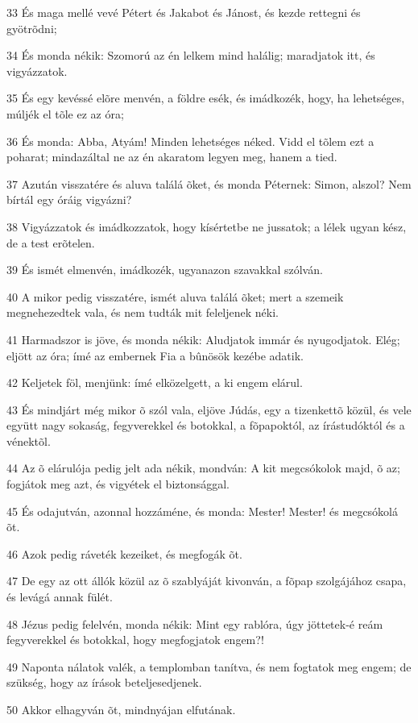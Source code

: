 \par 33 És maga mellé vevé Pétert és Jakabot és Jánost, és kezde rettegni és gyötrõdni;
\par 34 És monda nékik: Szomorú az én lelkem mind halálig; maradjatok itt, és vigyázzatok.
\par 35 És egy kevéssé elõre menvén, a földre esék, és imádkozék, hogy, ha lehetséges, múljék el tõle ez az óra;
\par 36 És monda: Abba, Atyám! Minden lehetséges néked. Vidd el tõlem ezt a poharat; mindazáltal ne az én akaratom legyen meg, hanem a tied.
\par 37 Azután visszatére és aluva találá õket, és monda Péternek: Simon, alszol? Nem bírtál egy óráig vigyázni?
\par 38 Vigyázzatok és imádkozzatok, hogy kísértetbe ne jussatok; a lélek ugyan kész, de a test erõtelen.
\par 39 És ismét elmenvén, imádkozék, ugyanazon szavakkal szólván.
\par 40 A mikor pedig visszatére, ismét aluva találá õket; mert a szemeik megnehezedtek vala, és nem tudták mit feleljenek néki.
\par 41 Harmadszor is jöve, és monda nékik: Aludjatok immár és nyugodjatok. Elég; eljött az óra; ímé az embernek Fia a bûnösök kezébe adatik.
\par 42 Keljetek föl, menjünk: ímé elközelgett, a ki engem elárul.
\par 43 És mindjárt még mikor õ szól vala, eljöve Júdás, egy a tizenkettõ közül, és vele együtt nagy sokaság, fegyverekkel és botokkal, a fõpapoktól, az írástudóktól és a vénektõl.
\par 44 Az õ elárulója pedig jelt ada nékik, mondván: A kit megcsókolok majd, õ az; fogjátok meg azt, és vigyétek el biztonsággal.
\par 45 És odajutván, azonnal hozzáméne, és monda: Mester! Mester! és megcsókolá õt.
\par 46 Azok pedig ráveték kezeiket, és megfogák õt.
\par 47 De egy az ott állók közül az õ szablyáját kivonván, a fõpap szolgájához csapa, és levágá annak fülét.
\par 48 Jézus pedig felelvén, monda nékik: Mint egy rablóra, úgy jöttetek-é reám fegyverekkel és botokkal, hogy megfogjatok engem?!
\par 49 Naponta nálatok valék, a templomban tanítva, és nem fogtatok meg engem; de szükség, hogy az írások beteljesedjenek.
\par 50 Akkor elhagyván õt, mindnyájan elfutának.

